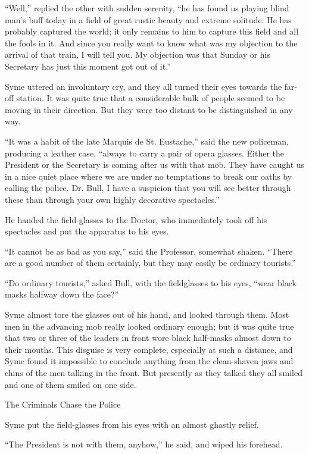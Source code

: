 “Well,” replied the other with sudden serenity, “he has found us playing blind man’s buff today in a field of great rustic beauty and extreme solitude. He has probably captured the world; it only remains to him to capture this field and all the fools in it. And since you really want to know what was my objection to the arrival of that train, I will tell you. My objection was that Sunday or his Secretary has just this moment got out of it.”

Syme uttered an involuntary cry, and they all turned their eyes towards the far-off station. It was quite true that a considerable bulk of people seemed to be moving in their direction. But they were too distant to be distinguished in any way.

“It was a habit of the late Marquis de St. Eustache,” said the new policeman, producing a leather case, “always to carry a pair of opera glasses. Either the President or the Secretary is coming after us with that mob. They have caught us in a nice quiet place where we are under no temptations to break our oaths by calling the police. Dr. Bull, I have a suspicion that you will see better through these than through your own highly decorative spectacles.”

He handed the field-glasses to the Doctor, who immediately took off his spectacles and put the apparatus to his eyes.

“It cannot be as bad as you say,” said the Professor, somewhat shaken. “There are a good number of them certainly, but they may easily be ordinary tourists.”

“Do ordinary tourists,” asked Bull, with the fieldglasses to his eyes, “wear black masks halfway down the face?”

Syme almost tore the glasses out of his hand, and looked through them. Most men in the advancing mob really looked ordinary enough; but it was quite true that two or three of the leaders in front wore black half-masks almost down to their mouths. This disguise is very complete, especially at such a distance, and Syme found it impossible to conclude anything from the clean-shaven jaws and chins of the men talking in the front. But presently as they talked they all smiled and one of them smiled on one side.

\chap The Criminals Chase the Police

Syme put the field-glasses from his eyes with an almost ghastly relief.

“The President is not with them, anyhow,” he said, and wiped his forehead.


